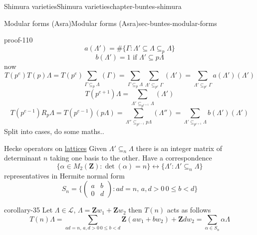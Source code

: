 \documentclass[oneside,10pt,]{book}
\numberwithin{equation}{section}
\newcommand{\ZZ}{\mathbf{Z}}
\newcommand{\lt}{<}
\newcommand{\gt}{>}
\newcommand{\amp}{&}
\begin{document}
\begin{chapterptx}{Shimura varieties}{}{Shimura varieties}{}{}{chapter-buntes-shimura}
\begin{sectionptx}{Modular forms (Asra)}{}{Modular forms (Asra)}{}{}{sec-buntes-modular-forms}
\begin{proofptx}{}{proof-110}
\begin{equation*}
a(\Lambda')  = \# \{ \Gamma : \Lambda'  \subseteq \Lambda \subseteq_p \Lambda \}
\end{equation*}
%
\begin{equation*}
b(\Lambda')  = 1 \text{ if } \Lambda' \subseteq p\Lambda
\end{equation*}
now%
\begin{equation*}
T(p^e)T(p) \Lambda = T(p^e) \sum_{\Gamma \subseteq_p \Lambda } (\Gamma) = \sum_{\Gamma \subseteq_p \Lambda } \sum_{\Lambda' \subseteq_{p^e} \Gamma} (\Lambda') =\sum_{\Lambda' \subseteq_{p^e} \Gamma}  a(\Lambda') (\Lambda')
\end{equation*}
%
\begin{equation*}
T(p^{e+1} ) \Lambda  =  \sum_{\Lambda'\subseteq_{p^{e+1}} \Lambda} (\Lambda')
\end{equation*}
%
\begin{equation*}
T(p^{e-1} )R_p \Lambda  =  T(p^{e-1}) (p \Lambda) = \sum_{\Lambda'' \subseteq_{p^{e-1}} p\Lambda } (\Lambda'') = \sum_{\Lambda' \subseteq_{p^{e+1}} \Lambda} b(\Lambda') (\Lambda')
\end{equation*}
Split into cases, do some maths..%
\end{proofptx}
\hypertarget{p-1077}{}%
Hecke operators on \hyperref[def-buntes-lattice]{lattices} Given \(\Lambda' \subseteq_n \Lambda\) there is an integer matrix of determinant  \(n\) taking one basis to the other. Have a correspondence%
\begin{equation*}
\{ \alpha \in M_2(\ZZ) : \det(\alpha) = n \}  \leftrightarrow \{ \Lambda ' : \Lambda ' \subseteq_n \Lambda\}
\end{equation*}
representatives in Hermite normal form%
\begin{equation*}
S_n = \{\begin{pmatrix} a\amp b \\ 0 \amp d\end{pmatrix} : ad= n,\, a,d\gt 0\, 0\le b \lt d\}
\end{equation*}
%
\begin{corollary}{}{}{corollary-35}%
\hypertarget{p-1078}{}%
Let \(\Lambda \in \mathcal L\), \(\Lambda = \ZZ w_1 + \ZZ w_2\) then  \(T(n)\) acts as follows%
\begin{equation*}
T(n) \Lambda =  \sum_{ ad= n,\, a,d\gt 0\, 0\le b \lt d} \ZZ(aw_1 + bw_2) + \ZZ dw_2 = \sum_{\alpha \in S_n} \alpha \Lambda
\end{equation*}
%
\end{corollary}

\end{sectionptx}
\end{chapterptx}
\end{document}
